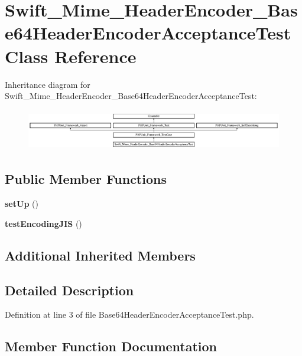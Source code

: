\section{Swift\+\_\+\+Mime\+\_\+\+Header\+Encoder\+\_\+\+Base64\+Header\+Encoder\+Acceptance\+Test Class Reference}
\label{class_swift___mime___header_encoder___base64_header_encoder_acceptance_test}
Inheritance diagram for Swift\+\_\+\+Mime\+\_\+\+Header\+Encoder\+\_\+\+Base64\+Header\+Encoder\+Acceptance\+Test\+:\begin{figure}[H]
\begin{center}
\leavevmode
\includegraphics[height=1.816707cm]{class_swift___mime___header_encoder___base64_header_encoder_acceptance_test}
\end{center}
\end{figure}
\subsection*{Public Member Functions}
\begin{DoxyCompactItemize}
\item 
{\bf set\+Up} ()
\item 
{\bf test\+Encoding\+J\+I\+S} ()
\end{DoxyCompactItemize}
\subsection*{Additional Inherited Members}


\subsection{Detailed Description}


Definition at line 3 of file Base64\+Header\+Encoder\+Acceptance\+Test.\+php.



\subsection{Member Function Documentation}
